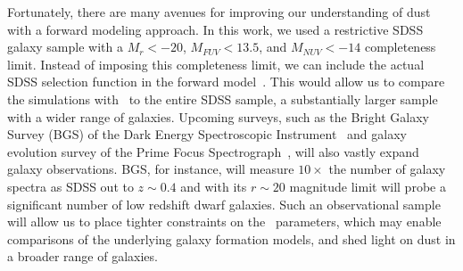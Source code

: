Fortunately, there are many avenues for improving our understanding of dust
with a forward modeling approach. 
In this work, we used a restrictive SDSS galaxy sample with a $M_r < -20$,
$M_{FUV} < 13.5$, and $M_{NUV} < -14$ completeness limit. 
Instead of imposing this completeness limit, we can include the actual SDSS
selection function in the forward 
model~\citep[\eg~][]{dickey2020}. 
This would allow us to compare the simulations with \eda~to the entire SDSS
sample, a substantially larger sample with a wider range of galaxies. 
Upcoming surveys, such as the Bright Galaxy Survey (BGS) of the Dark Energy
Spectroscopic Instrument~\citep[DESI;][]{desicollaboration2016, ruiz-macias2020} 
and galaxy evolution survey of the Prime Focus
Spectrograph~\citep[PFS;][]{takada2014,tamura2016}, will also vastly expand galaxy
observations. 
BGS, for instance, will measure $10\times$ the number of galaxy spectra as
SDSS out to $z\sim0.4$  and with its $r\sim20$ magnitude limit will probe
a significant number of low redshift dwarf galaxies. 
Such an observational sample will allow us to place tighter constraints on
the \eda~parameters, which may enable comparisons of the underlying galaxy
formation models, and shed light on dust in a broader range of galaxies.
    
